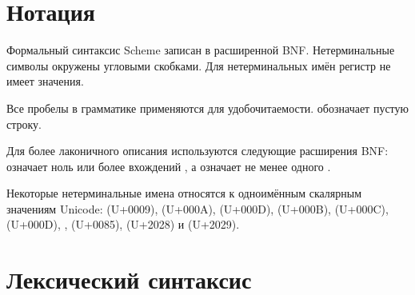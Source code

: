 \section{Нотация}
\label{BNF}

Формальный синтаксис Scheme записан в расширенной BNF. Нетерминальные символы окружены
угловыми скобками. Для нетерминальных имён регистр не имеет значения.

Все пробелы в грамматике применяются для удобочитаемости.  обозначает пустую строку.

Для более лаконичного описания используются следующие расширения BNF:  означает
ноль или более вхождений , а  означает не менее
одного .

Некоторые нетерминальные имена относятся к одноимённым скалярным значениям Unicode:
 (U+0009),  (U+000A),  (U+000D),
 (U+000B),  (U+000C),  (U+000D),
,  (U+0085),  (U+2028) и
 (U+2029).\vspace{-1mm}

\section{Лексический синтаксис}
\label{lexicalsyntaxsection}

